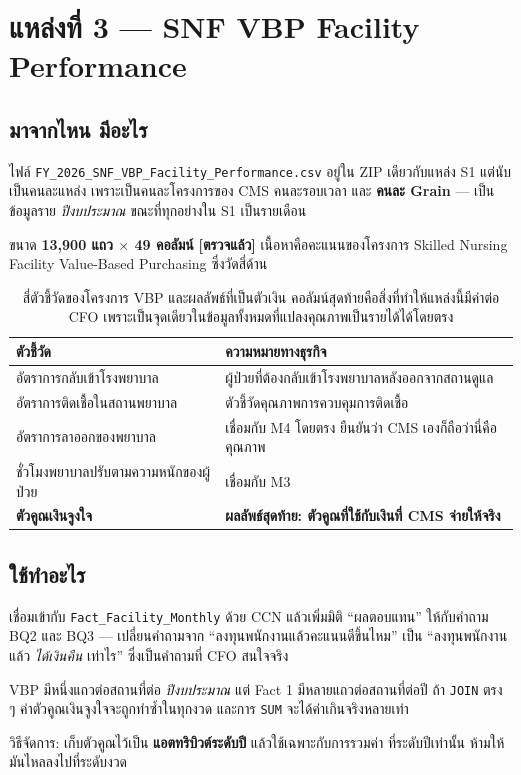 \documentclass[11pt,a4paper]{article}
\newcommand{\sansall}{\sffamily}
\newcommand{\en}[1]{#1}
\newcommand{\code}[1]{\texttt{#1}}
\newcommand{\ok}{\textcolor{dw}{\textbf{[ตรวจแล้ว]}}}
\begin{document}
\section{แหล่งที่ 3 --- SNF VBP Facility Performance}

\subsection{มาจากไหน มีอะไร}
ไฟล์ \code{FY_2026_SNF_VBP_Facility_Performance.csv} อยู่ใน ZIP เดียวกับแหล่ง S1
แต่นับเป็นคนละแหล่ง เพราะเป็นคนละโครงการของ CMS คนละรอบเวลา และ
\textbf{คนละ Grain} --- เป็นข้อมูลราย \emph{ปีงบประมาณ} ขณะที่ทุกอย่างใน S1 เป็นรายเดือน

ขนาด \textbf{13{,}900 แถว $\times$ 49 คอลัมน์} \ok{} เนื้อหาคือคะแนนของโครงการ
\en{Skilled Nursing Facility Value-Based Purchasing} ซึ่งวัดสี่ด้าน

\begin{table}[H]\centering\small
\begin{tabular}{L{5.4cm} L{10.6cm}}
\toprule
\sansall\bfseries ตัวชี้วัด & \sansall\bfseries ความหมายทางธุรกิจ \\
\midrule
อัตราการกลับเข้าโรงพยาบาล & ผู้ป่วยที่ต้องกลับเข้าโรงพยาบาลหลังออกจากสถานดูแล \\
อัตราการติดเชื้อในสถานพยาบาล & ตัวชี้วัดคุณภาพการควบคุมการติดเชื้อ \\
อัตราการลาออกของพยาบาล & เชื่อมกับ M4 โดยตรง ยืนยันว่า CMS เองก็ถือว่านี่คือคุณภาพ \\
ชั่วโมงพยาบาลปรับตามความหนักของผู้ป่วย & เชื่อมกับ M3 \\
\addlinespace
\textbf{ตัวคูณเงินจูงใจ} & \textbf{ผลลัพธ์สุดท้าย: ตัวคูณที่ใช้กับเงินที่ CMS จ่ายให้จริง} \\
\bottomrule
\end{tabular}
\caption{สี่ตัวชี้วัดของโครงการ VBP และผลลัพธ์ที่เป็นตัวเงิน คอลัมน์สุดท้ายคือสิ่งที่ทำให้แหล่งนี้มีค่าต่อ CFO เพราะเป็นจุดเดียวในข้อมูลทั้งหมดที่แปลงคุณภาพเป็นรายได้ได้โดยตรง}
\end{table}

\subsection{ใช้ทำอะไร}
เชื่อมเข้ากับ \code{Fact_Facility_Monthly} ด้วย CCN แล้วเพิ่มมิติ ``ผลตอบแทน''
ให้กับคำถาม BQ2 และ BQ3 --- เปลี่ยนคำถามจาก ``ลงทุนพนักงานแล้วคะแนนดีขึ้นไหม''
เป็น ``ลงทุนพนักงานแล้ว \emph{ได้เงินคืน} เท่าไร'' ซึ่งเป็นคำถามที่ CFO สนใจจริง

\begin{warnbox}[title={การเชื่อมข้าม Grain ต้องระวังการนับซ้ำ}]
VBP มีหนึ่งแถวต่อสถานที่ต่อ \emph{ปีงบประมาณ} แต่ Fact 1 มีหลายแถวต่อสถานที่ต่อปี
ถ้า \code{JOIN} ตรง ๆ ค่าตัวคูณเงินจูงใจจะถูกทำซ้ำในทุกงวด และการ \code{SUM}
จะได้ค่าเกินจริงหลายเท่า

\vspace{0.3em}
วิธีจัดการ: เก็บตัวคูณไว้เป็น \textbf{แอตทริบิวต์ระดับปี} แล้วใช้เฉพาะกับการรวมค่า
ที่ระดับปีเท่านั้น ห้ามให้มันไหลลงไปที่ระดับงวด
\end{warnbox}
\end{document}
